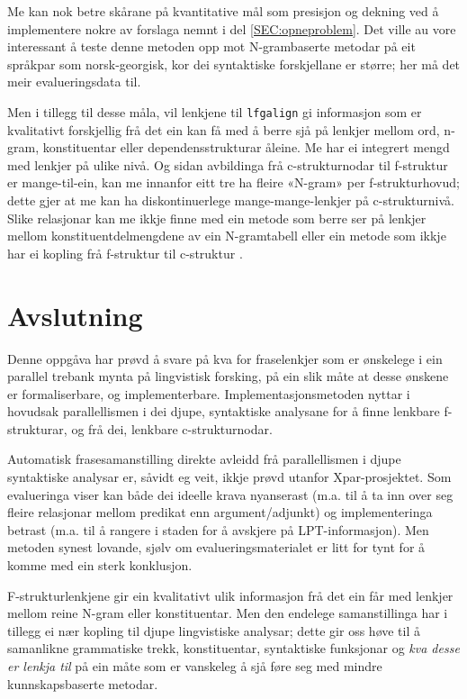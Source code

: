 \documentclass[12pt,a4paper,oneside,draft]{report}
\begin{document}
Me kan nok betre skårane på kvantitative mål som presisjon og dekning
 ved å implementere nokre av forslaga nemnt i del
 \ref{SEC:opneproblem}. Det ville au vore interessant å teste denne
 metoden opp mot N-grambaserte metodar på eit språkpar som
 norsk-georgisk, kor dei syntaktiske forskjellane er større; her må
 det meir evalueringsdata til.

Men i tillegg til desse måla, vil lenkjene til \texttt{lfgalign} gi
 informasjon som er kvalitativt forskjellig frå det ein kan få med å
 berre sjå på lenkjer mellom ord, n-gram, konstituentar eller
 dependensstrukturar åleine. Me har ei integrert mengd med lenkjer på
 ulike nivå. Og sidan avbildinga frå c-strukturnodar til f-struktur er
 mange-til-ein, kan me innanfor eitt tre ha fleire «N-gram» per
 f-strukturhovud; dette gjer at me kan ha diskontinuerlege
 mange-mange-lenkjer på c-strukturnivå.  Slike relasjonar kan me ikkje
 finne med ein metode som berre ser på lenkjer mellom
 konstituentdelmengdene av ein N-gramtabell \citep{samuelsson2007apa}
 eller ein metode som ikkje har ei kopling frå f-struktur til
 c-struktur \citep{graham2009fts}.



     
\chapter{Avslutning}
\label{sec-6}


Denne oppgåva har prøvd å svare på kva for fraselenkjer som er
 ønskelege i ein parallel trebank mynta på lingvistisk forsking, på
 ein slik måte at desse ønskene er formaliserbare, og
 implementerbare. Implementasjonsmetoden nyttar i hovudsak
 parallellismen i dei djupe, syntaktiske analysane for å finne
 lenkbare f-strukturar, og frå dei, lenkbare c-strukturnodar.

Automatisk frasesamanstilling direkte avleidd frå parallellismen i
 djupe syntaktiske analysar er, såvidt eg veit, ikkje prøvd utanfor
 Xpar-prosjektet. Som evalueringa viser kan både dei ideelle krava
 nyanserast (m.a. til å ta inn over seg fleire relasjonar mellom
 predikat enn argument/adjunkt) og implementeringa betrast (m.a. til å
 rangere i staden for å avskjere på LPT-informasjon). Men metoden
 synest lovande, sjølv om evalueringsmaterialet er litt for tynt for å
 komme med ein sterk konklusjon.

F-strukturlenkjene gir ein kvalitativt ulik informasjon frå det ein
 får med lenkjer mellom reine N-gram eller konstituentar. Men den
 endelege samanstillinga har i tillegg ei nær kopling til djupe
 lingvistiske analysar; dette gir oss høve til å samanlikne
 grammatiske trekk, konstituentar, syntaktiske funksjonar og \emph{kva  desse er lenkja til} på ein måte som er vanskeleg å sjå føre seg med
 mindre kunnskapsbaserte metodar. 
\end{document}
